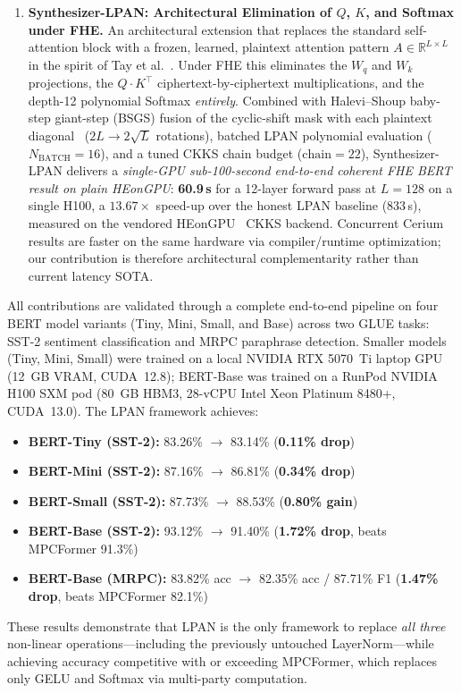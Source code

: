 \begin{enumerate}
    \item \textbf{Synthesizer-LPAN: Architectural Elimination of $Q$, $K$, and Softmax under FHE.} An architectural extension that replaces the standard self-attention block with a frozen, learned, plaintext attention pattern $A \in \mathbb{R}^{L\times L}$ in the spirit of Tay et al.~\cite{tay2020synthesizer}. Under FHE this eliminates the $W_q$ and $W_k$ projections, the $Q\!\cdot\!K^\top$ ciphertext-by-ciphertext multiplications, and the depth-12 polynomial Softmax \emph{entirely}. Combined with Halevi--Shoup baby-step giant-step (BSGS) fusion of the cyclic-shift mask with each plaintext diagonal~\cite{halevi2014bsgs} ($2L \to 2\sqrt{L}$ rotations), batched LPAN polynomial evaluation ($N_{\mathrm{BATCH}}{=}16$), and a tuned CKKS chain budget ($\mathrm{chain}{=}22$), Synthesizer-LPAN delivers a \emph{single-GPU sub-100-second end-to-end coherent FHE BERT result on plain HEonGPU}: \textbf{60.9\,s} for a 12-layer forward pass at $L{=}128$ on a single H100, a $\mathbf{13.67\times}$ speed-up over the honest LPAN baseline ($833$\,s), measured on the vendored HEonGPU~\cite{kim2024heongpu} CKKS backend. Concurrent Cerium results are faster on the same hardware via compiler/runtime optimization; our contribution is therefore architectural complementarity rather than current latency SOTA.
\end{enumerate}

All contributions are validated through a complete end-to-end pipeline on four BERT model variants (Tiny, Mini, Small, and Base) across two GLUE tasks: SST-2 sentiment classification and MRPC paraphrase detection. Smaller models (Tiny, Mini, Small) were trained on a local NVIDIA RTX 5070~Ti laptop GPU (12~GB VRAM, CUDA~12.8); BERT-Base was trained on a RunPod NVIDIA H100 SXM pod (80~GB HBM3, 28-vCPU Intel Xeon Platinum 8480+, CUDA~13.0). The LPAN framework achieves:
\begin{itemize}
    \item \textbf{BERT-Tiny (SST-2):} 83.26\% $\to$ 83.14\% (\textbf{0.11\% drop})
    \item \textbf{BERT-Mini (SST-2):} 87.16\% $\to$ 86.81\% (\textbf{0.34\% drop})
    \item \textbf{BERT-Small (SST-2):} 87.73\% $\to$ 88.53\% (\textbf{0.80\% gain})
    \item \textbf{BERT-Base (SST-2):} 93.12\% $\to$ 91.40\% (\textbf{1.72\% drop}, beats MPCFormer 91.3\%)
    \item \textbf{BERT-Base (MRPC):} 83.82\% acc $\to$ 82.35\% acc / 87.71\% F1 (\textbf{1.47\% drop}, beats MPCFormer 82.1\%)
\end{itemize}
These results demonstrate that LPAN is the only framework to replace \emph{all three} non-linear operations---including the previously untouched LayerNorm---while achieving accuracy competitive with or exceeding MPCFormer, which replaces only GELU and Softmax via multi-party computation.


